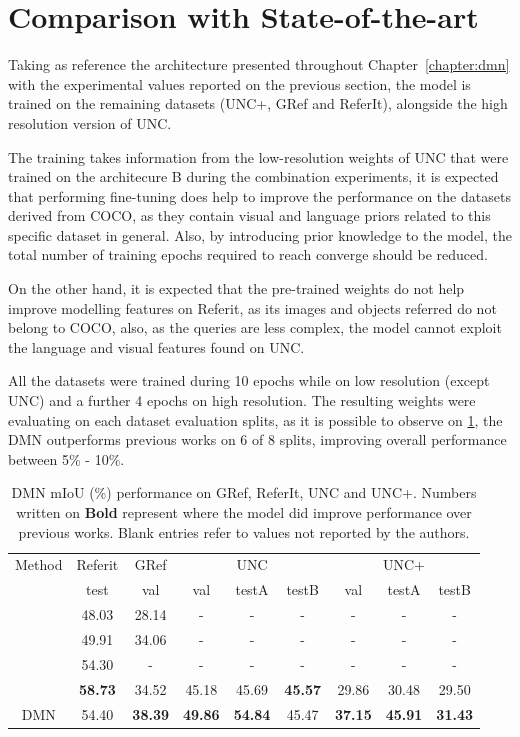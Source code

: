 \section{Comparison with State-of-the-art}
\label{section:comp}
Taking as reference the architecture presented throughout Chapter~\ref{chapter:dmn} with the experimental values reported on the previous section, the model is trained on the remaining datasets (UNC+, GRef and ReferIt), alongside the high resolution version of UNC. 

The training takes information from the low-resolution weights of UNC that were trained on the architecure B during the combination experiments, it is expected that performing  fine-tuning does help to improve the performance on the datasets derived from COCO, as they contain visual and language priors related to this specific dataset in general. Also, by introducing prior knowledge to the model, the total number of training epochs required to reach converge should be reduced. 

On the other hand, it is expected that the pre-trained weights do not help improve modelling features on Referit, as its images and objects referred do not belong to COCO, also, as the queries are less complex, the model cannot exploit the language and visual features found on UNC.

All the datasets were trained during 10 epochs while on low resolution (except UNC) and a further 4 epochs on high resolution. The resulting weights were evaluating on each dataset evaluation splits, as it is possible to observe on \ref{Tab:soa-results}, the DMN outperforms previous works on 6 of 8 splits, improving overall performance between 5\% - 10\%.

\begin{table}[!htbp]
    \centering
    \begin{tabular}{ c | c | c | c | c | c | c | c | c }
\hline
Method 	&\multicolumn{1}{c|}{Referit} 		& \multicolumn{1}{c|}{GRef} & \multicolumn{3}{c|}{UNC} 			& \multicolumn{3}{c}{UNC+} 		\\
							& test 			& val 						& val		& testA 	& testB 	& val 		& testA 	& testB 	\\
\hline
\cite{hu2016segmentation} 	& 48.03 		& 28.14						& - 		& -			& -			& -			& -			& - 		\\
\cite{Hu2016} 				& 49.91      	& 34.06						& - 		& -			& -			& -			& -			& - 		\\
\cite{li2017cvpr} 			& 54.30      	& - 						& - 		& -			& -			& -			& -			& - 		\\
\cite{liu2017segmentation}	&\textbf{58.73}		& 34.52 					& 45.18		& 45.69 	&\textbf{45.57} & 29.86		& 30.48 	& 29.50 	\\
\hline
DMN						& 54.40	 		& \textbf{38.39} 				&\textbf{49.86}	& \textbf{54.84}& 45.47  	&\textbf{37.15}	&\textbf{45.91}	& \textbf{31.43} \\
\hline  
\end{tabular}
    \caption{DMN mIoU (\%) performance on GRef, ReferIt, UNC and UNC+. Numbers written on \textbf{Bold} represent where the model did improve performance over previous works. Blank entries refer to values not reported by the authors.}
    \label{Tab:soa-results}
\end{table}


